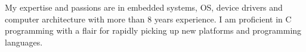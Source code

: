 My expertise and passions are in embedded systems, OS, device drivers and computer architecture with more than 8 years experience. I am proficient in C programming with a flair for rapidly picking up new platforms and programming languages.
